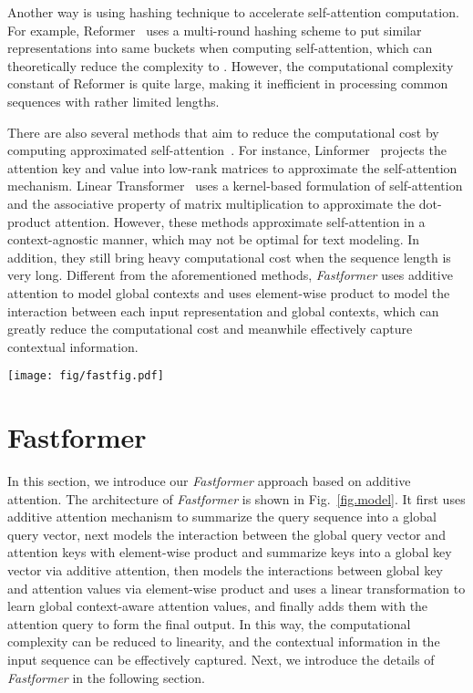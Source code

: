 \documentclass[11pt,a4paper]{article}
\begin{document}
Another way is using hashing technique to accelerate self-attention computation.
For example, Reformer~\cite{Kitaev2020reformer} uses a multi-round hashing scheme to put similar representations into same buckets when computing self-attention, which can theoretically reduce the complexity to .
However, the computational complexity constant of Reformer is quite large, making it inefficient in processing common sequences with rather limited lengths.

There are also several methods that aim to reduce the computational cost by computing approximated  self-attention~\cite{choromanski2020masked,wang2020linformer,tay2021synthesizer}.
For instance, Linformer~\cite{wang2020linformer} projects the attention key and value into low-rank matrices to approximate the self-attention mechanism.
Linear Transformer~\cite{katharopoulos2020transformers} uses a kernel-based formulation of self-attention and the associative
property of matrix multiplication to approximate the dot-product attention.
However, these methods approximate self-attention in a context-agnostic manner, which may not be optimal for text modeling. 
In addition, they still bring heavy computational cost when the sequence length is very long.
Different from the aforementioned methods, \textit{Fastformer} uses additive attention to model global contexts and uses element-wise product to model the interaction between each input representation and global contexts, which can greatly reduce the computational cost and meanwhile effectively capture contextual information. 
 
\begin{figure*}[!t]
  \centering 
      \texttt{[image: fig/fastfig.pdf]}
  \caption{The architecture of \textit{Fastformer}.}\label{fig.model}

\end{figure*}

\section{Fastformer}\label{sec:Model}

In this section, we introduce our \textit{Fastformer} approach based on additive attention.
The architecture of \textit{Fastformer} is shown in Fig.~\ref{fig.model}.
It first uses additive attention mechanism to summarize the query sequence into a global query vector, next models the interaction between the global query vector and attention keys with element-wise product and summarize keys into a global key vector via additive attention, then models the interactions between global key and attention values via element-wise product and uses a linear transformation to learn global context-aware attention values, and finally adds them with the attention query to form the final output.
In this way, the computational complexity can be reduced to linearity, and the contextual information in the input sequence can be effectively captured.
Next, we introduce the details of \textit{Fastformer} in the following section.
\end{document}
